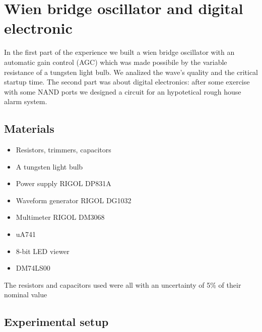 \chapter{Wien bridge oscillator and digital electronic}
In the first part of the experience we built a wien bridge oscillator with an automatic gain control (AGC) which was made possibile by the variable resistance of a tungsten light bulb. We analized the wave's quality and the critical startup time. The second part was about digital electronics: after some exercise with some NAND ports we designed a circuit for an hypotetical rough house alarm system.

\section{Materials}
\begin{itemize}
\item Resistors, trimmers, capacitors
\item A tungsten light bulb
\item Power supply RIGOL DP831A
\item Waveform generator RIGOL DG1032
\item Multimeter RIGOL DM3068
\item uA741
\item 8-bit LED viewer
\item DM74LS00
\end{itemize}
The resistors and capacitors used were all with an uncertainty of 5\% of their nominal value

\section{Experimental setup}

